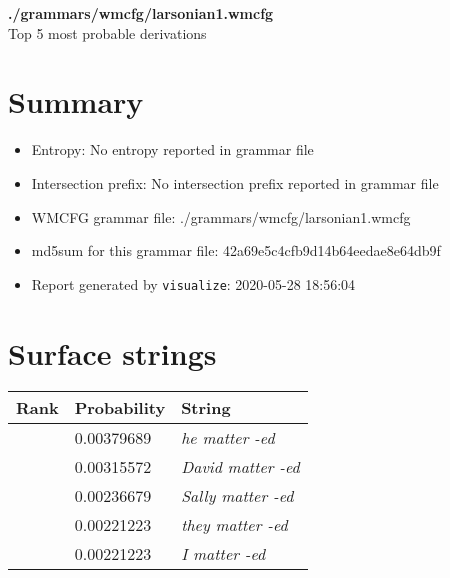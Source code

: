 \documentclass[11pt]{article}
\begin{document}
\begin{center}
{\huge \textbf{./grammars/wmcfg/larsonian1.wmcfg}} \\[0.5em]
{\normalsize Top 5 most probable derivations}
\end{center}

\section{Summary}
\begin{itemize}
	\item Entropy: No entropy reported in grammar file
	\item Intersection prefix: No intersection prefix reported in grammar file
	\item WMCFG grammar file: ./grammars/wmcfg/larsonian1.wmcfg
	\item md5sum for this grammar file: 42a69e5c4cfb9d14b64eedae8e64db9f
	\item Report generated by \texttt{visualize}: 2020-05-28 18:56:04
\end{itemize}

\section{Surface strings}
\hspace{1em}
\renewcommand{\arraystretch}{1.15}
\newcommand\rownumber{\stepcounter{rownumber}\arabic{rownumber}}
\begin{tabular}{l l l}
	\hline
	 Rank & Probability & String \\
	\hline
\rownumber & 0.00379689 & \textit{he matter -ed} \\
\rownumber & 0.00315572 & \textit{David matter -ed} \\
\rownumber & 0.00236679 & \textit{Sally matter -ed} \\
\rownumber & 0.00221223 & \textit{they matter -ed} \\
\rownumber & 0.00221223 & \textit{I matter -ed} \\
	\hline
\end{tabular}
\end{document}

